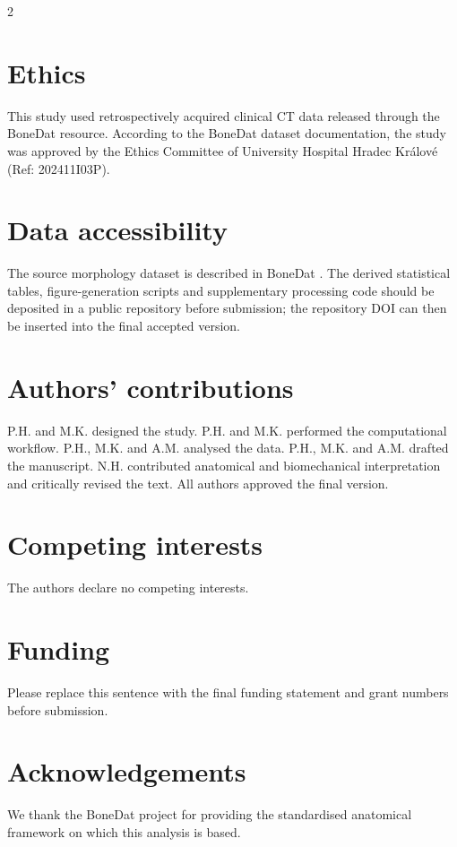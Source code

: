\documentclass[openacc]{rsproca_new}
\begin{document}
\begin{multicols}{2}
\section*{Ethics}

This study used retrospectively acquired clinical CT data released through the BoneDat resource. According to the BoneDat dataset documentation, the study was approved by the Ethics Committee of University Hospital Hradec Kr\'{a}lov\'{e} (Ref: 202411I03P).

\section*{Data accessibility}

The source morphology dataset is described in BoneDat \cite{HenysKuchar2025}. The derived statistical tables, figure-generation scripts and supplementary processing code should be deposited in a public repository before submission; the repository DOI can then be inserted into the final accepted version.

\section*{Authors' contributions}

P.H. and M.K. designed the study. P.H. and M.K. performed the computational workflow. P.H., M.K. and A.M. analysed the data. P.H., M.K. and A.M. drafted the manuscript. N.H. contributed anatomical and biomechanical interpretation and critically revised the text. All authors approved the final version.

\section*{Competing interests}

The authors declare no competing interests.

\section*{Funding}

Please replace this sentence with the final funding statement and grant numbers before submission.

\section*{Acknowledgements}

We thank the BoneDat project for providing the standardised anatomical framework on which this analysis is based.

\end{multicols}
\end{document}
